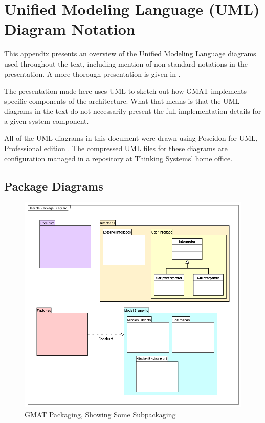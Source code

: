 \chapter{\label{chapter:UMLDiagrams}Unified Modeling Language (UML) Diagram Notation}

This appendix presents an overview of the Unified Modeling Language diagrams used throughout the
text, including mention of non-standard notations in the presentation.  A more thorough presentation
is given in \cite{fowler}.

The presentation made here uses UML to sketch out how GMAT implements specific components of the
architecture.  What that means is that the UML diagrams in the text do not necessarily present the
full implementation details for a given system component.

All of the UML diagrams in this document were drawn using Poseidon for UML, Professional edition
\cite{poseidon}.  The compressed UML files for these diagrams are configuration managed in a
repository at Thinking Systems' home office.

\section{Package Diagrams}

\begin{figure}[htb]
\begin{center}
\includegraphics[360,340]{Images/UmlPackageSample.png}
\caption{\label{figure:UmlPackageExample}GMAT Packaging, Showing Some Subpackaging}
\end{center}
\end{figure}

